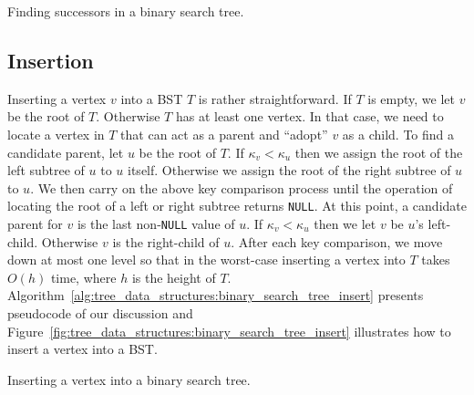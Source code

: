 \begin{algorithm}[!htbp]

\caption{Finding successors in a binary search tree.}
\label{alg:tree_data_structures:binary_search_tree_successors}
\end{algorithm}



\subsection{Insertion}

Inserting a vertex $v$ into a BST $T$ is rather straightforward. If
$T$ is empty, we let $v$ be the root of $T$. Otherwise $T$ has at
least one vertex. In that case, we need to locate a vertex in $T$ that
can act as a parent and ``adopt'' $v$ as a child. To find a candidate
parent, let $u$ be the root of $T$. If $\kappa_v < \kappa_u$ then we
assign the root of the left subtree of $u$ to $u$ itself. Otherwise we
assign the root of the right subtree of $u$ to $u$. We then carry on
the above key comparison process until the operation of locating the
root of a left or right subtree returns \texttt{NULL}. At this point,
a candidate parent for $v$ is the last non-\texttt{NULL} value of
$u$. If $\kappa_v < \kappa_u$ then we let $v$ be $u$'s
left-child. Otherwise $v$ is the right-child of $u$. After each key
comparison, we move down at most one level so that in the worst-case
inserting a vertex into $T$ takes $O(h)$ time, where $h$ is the height
of $T$.
Algorithm~\ref{alg:tree_data_structures:binary_search_tree_insert}
presents pseudocode of our discussion and
Figure~\ref{fig:tree_data_structures:binary_search_tree_insert}
illustrates how to insert a vertex into a BST.

\begin{algorithm}[!htbp]

\caption{Inserting a vertex into a binary search tree.}
\label{alg:tree_data_structures:binary_search_tree_insert}
\end{algorithm}

